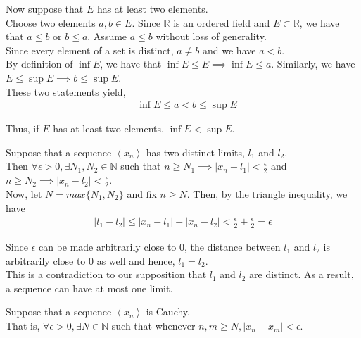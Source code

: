 \documentclass[12pt]{article}
\newenvironment{problem}[2][Problem]{\begin{trivlist}
\item[\hskip \labelsep {\bfseries #1}\hskip \labelsep {\bfseries #2.}]}{\end{trivlist}}
\begin{document}
Now suppose that $E$ has at least two elements.\\

Choose two elements $a, b \in E$. Since $\mathbb{R}$ is an ordered field and $E \subset \mathbb{R}$, we have that $a \leq b$ or $b \leq a$. Assume $a \leq b$ without loss of generality.\\

Since every element of a set is distinct, $a \neq b$ and we have $a < b$.\\

By definition of $\inf E$, we have that $\inf E \leq E \implies \inf E \leq a$. Similarly, we have $E \leq \sup E \implies b \leq \sup E$.\\

These two statements yield,
\begin{align*}
&\inf E \leq a < b \leq \sup E
\end{align*}

Thus, if $E$ has at least two elements, $\inf E < \sup E$.

\begin{problem}{3}
\end{problem}	

Suppose that a sequence $\left<x_n\right>$ has two distinct limits, $l_1$ and $l_2$.\\

Then $\forall \epsilon > 0, \exists N_1, N_2 \in \mathbb{N}$ such that $n \geq N_1 \implies | x_n - l_1 | < \frac{\epsilon}{2}$ and $n \geq N_2 \implies | x_n - l_2 | < \frac{\epsilon}{2}$.\\

Now, let $N = max\{N_1, N_2\}$ and fix $n \geq N$. Then, by the triangle inequality, we have
\begin{align*}
| l_1 - l_2 | \leq | x_n - l_1 | + | x_n - l_2 | < \frac{\epsilon}{2} + \frac{\epsilon}{2} = \epsilon
\end{align*}

Since $\epsilon$ can be made arbitrarily close to 0, the distance between $l_1$ and $l_2$ is arbitrarily close to 0 as well and hence, $l_1 = l_2$.\\

This is a contradiction to our supposition that $l_1$ and $l_2$ are distinct. As a result, a sequence can have at most one limit.

\begin{problem}{4}
\end{problem}

Suppose that a sequence $\left<x_n\right>$ is Cauchy.\\

That is, $\forall \epsilon > 0, \exists N \in \mathbb{N}$ such that whenever $n, m \geq N, | x_n - x_m | < \epsilon$.
\end{document}
